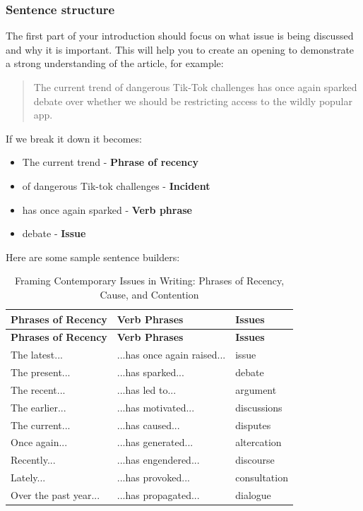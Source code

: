 \documentclass[a4paper]{article}
\begin{document}
\subsubsection{Sentence structure}
The first part of your introduction should focus on what issue is being discussed and why it is important. This will help you to create an opening to demonstrate a strong understanding of the article, for example:
\begin{quote}
    The current trend of dangerous Tik-Tok challenges has once again sparked debate over whether we should be restricting access to the wildly popular app. 
\end{quote}

If we break it down it becomes:
\begin{itemize}
    \item The current trend - \textbf{Phrase of recency}
    \item of dangerous Tik-tok challenges - \textbf{Incident}
    \item has once again sparked - \textbf{Verb phrase}
    \item debate - \textbf{Issue}
\end{itemize}

Here are some sample sentence builders:

\begin{longtable}{|p{2.5cm}|p{3cm}|p{2.25cm}|}
\caption{Framing Contemporary Issues in Writing: Phrases of Recency, Cause, and Contention} \label{tab:recencyphrases} \\
\hline
\textbf{Phrases of Recency} & \textbf{Verb Phrases} & \textbf{Issues} \\
\hline
\endfirsthead

\hline
\textbf{Phrases of Recency} & \textbf{Verb Phrases} & \textbf{Issues} \\
\hline
\endhead

\hline
\endfoot

The latest...         & ...has once again raised... & issue \\
The present...        & ...has sparked...           & debate \\
The recent...         & ...has led to...            & argument \\
The earlier...        & ...has motivated...         & discussions \\
The current...        & ...has caused...            & disputes \\
Once again...         & ...has generated...         & altercation \\
Recently...           & ...has engendered...        & discourse \\
Lately...             & ...has provoked...          & consultation \\
Over the past year... & ...has propagated...        & dialogue \\
\hline

\end{longtable}
\end{document}
